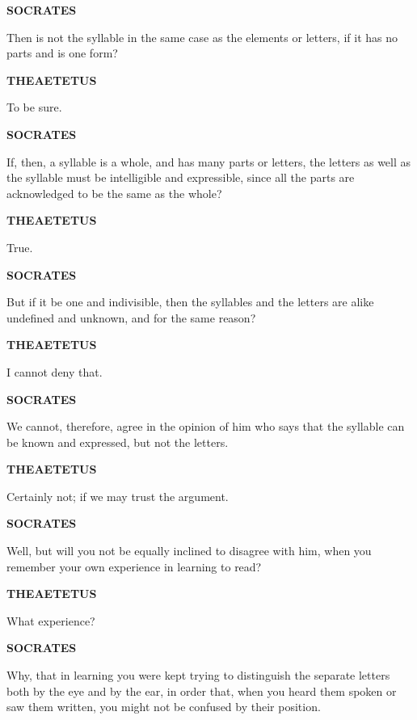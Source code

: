 \documentclass[11pt,letter]{article}
\begin{document}
\par \textbf{SOCRATES}
\par   Then is not the syllable in the same case as the elements or letters, if it has no parts and is one form?

\par \textbf{THEAETETUS}
\par   To be sure.

\par \textbf{SOCRATES}
\par   If, then, a syllable is a whole, and has many parts or letters, the letters as well as the syllable must be intelligible and expressible, since all the parts are acknowledged to be the same as the whole?

\par \textbf{THEAETETUS}
\par   True.

\par \textbf{SOCRATES}
\par   But if it be one and indivisible, then the syllables and the letters are alike undefined and unknown, and for the same reason?

\par \textbf{THEAETETUS}
\par   I cannot deny that.

\par \textbf{SOCRATES}
\par   We cannot, therefore, agree in the opinion of him who says that the syllable can be known and expressed, but not the letters.

\par \textbf{THEAETETUS}
\par   Certainly not; if we may trust the argument.

\par \textbf{SOCRATES}
\par   Well, but will you not be equally inclined to disagree with him, when you remember your own experience in learning to read?

\par \textbf{THEAETETUS}
\par   What experience?

\par \textbf{SOCRATES}
\par   Why, that in learning you were kept trying to distinguish the separate letters both by the eye and by the ear, in order that, when you heard them spoken or saw them written, you might not be confused by their position.
\end{document}
